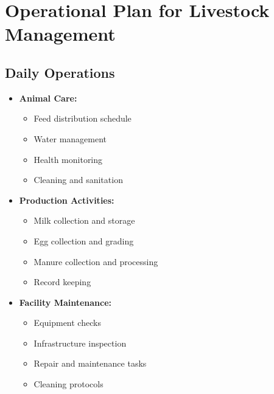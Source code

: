 \section{Operational Plan for Livestock Management}

\subsection{Daily Operations}
\begin{itemize}
    \item \textbf{Animal Care:}
    \begin{itemize}
        \item Feed distribution schedule
        \item Water management
        \item Health monitoring
        \item Cleaning and sanitation
    \end{itemize}
    
    \item \textbf{Production Activities:}
    \begin{itemize}
        \item Milk collection and storage
        \item Egg collection and grading
        \item Manure collection and processing
        \item Record keeping
    \end{itemize}
    
    \item \textbf{Facility Maintenance:}
    \begin{itemize}
        \item Equipment checks
        \item Infrastructure inspection
        \item Repair and maintenance tasks
        \item Cleaning protocols
    \end{itemize}
\end{itemize}

